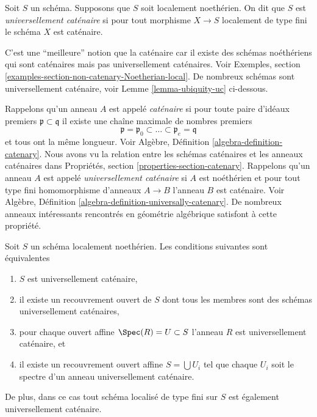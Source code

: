 \begin{definition}
\label{definition-universally-catenary}
Soit $S$ un schéma. Supposons que $S$ soit localement noethérien.
On dit que $S$ est {\it universellement caténaire}
si pour tout morphisme $X \to S$ localement de type fini le schéma $X$ est caténaire.
\end{definition}

\noindent
C'est une ``meilleure'' notion que la caténaire car il existe
des schémas noéthériens qui sont caténaires mais pas
universellement caténaires. Voir Exemples, section \ref{examples-section-non-catenary-Noetherian-local}. De nombreux
schémas sont universellement caténaire,
voir Lemme \ref{lemma-ubiquity-uc} ci-dessous.

\medskip\noindent Rappelons
qu'un anneau $A$ est appelé {\it
caténaire} si pour toute paire d'idéaux premiers $\mathfrak p \subset \mathfrak q$ il existe
une chaîne maximale de nombres premiers
$$
\mathfrak p =
\mathfrak p_0 \subset \ldots \subset \mathfrak p_e
= \mathfrak q
$$
et tous ont la même longueur. Voir Algèbre,
Définition \ref{algebra-definition-catenary}. Nous avons vu la relation entre les
schémas caténaires et les anneaux caténaires dans Propriétés,
section \ref{properties-section-catenary}. Rappelons qu'un anneau $A$ est appelé {\it
universellement caténaire} si $A$
est noéthérien et pour tout type fini homomorphisme d'anneaux
$A \to B$ l'anneau $B$
est caténaire. Voir Algèbre, Définition \ref{algebra-definition-universally-catenary}. De nombreux anneaux
intéressants rencontrés en géométrie
algébrique satisfont à cette propriété.

\begin{lemma}
\label{lemma-universally-catenary-local}
Soit $S$ un schéma localement noethérien. Les conditions suivantes sont équivalentes
\begin{enumerate}
\item $S$ est universellement caténaire,
\item il existe un recouvrement ouvert de $S$ dont tous les membres sont des
schémas universellement caténaires,
\item pour chaque ouvert affine $\Spec(R) = U \subset S$ l'anneau $R$ est
universellement caténaire, et
\item il existe un recouvrement ouvert affine $S = \bigcup U_i$ tel que chaque
$U_i$ soit le spectre d'un anneau universellement caténaire.
\end{enumerate}
De plus, dans ce cas tout schéma localisé de type fini sur $S$ est également
universellement caténaire.
\end{lemma}

